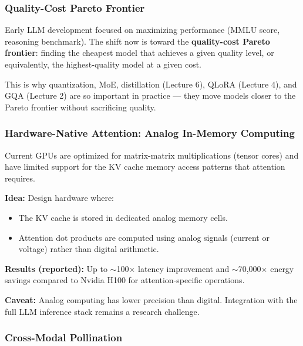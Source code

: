\documentclass[11pt, a4paper]{article}
\begin{document}
\subsubsection{Quality-Cost Pareto Frontier}

\begin{defbox}
Early LLM development focused on maximizing performance (MMLU score, reasoning benchmark). The shift now is toward the \textbf{quality-cost Pareto frontier}: finding the cheapest model that achieves a given quality level, or equivalently, the highest-quality model at a given cost.

This is why quantization, MoE, distillation (Lecture 6), QLoRA (Lecture 4), and GQA (Lecture 2) are so important in practice --- they move models closer to the Pareto frontier without sacrificing quality.
\end{defbox}

\subsubsection{Hardware-Native Attention: Analog In-Memory Computing}

\begin{defbox}
Current GPUs are optimized for matrix-matrix multiplications (tensor cores) and have limited support for the KV cache memory access patterns that attention requires.

\textbf{Idea:} Design hardware where:
\begin{itemize}[leftmargin=1.5em]
  \item The KV cache is stored in dedicated analog memory cells.
  \item Attention dot products are computed using analog signals (current or voltage) rather than digital arithmetic.
\end{itemize}

\textbf{Results (reported):} Up to $\sim$100$\times$ latency improvement and $\sim$70,000$\times$ energy savings compared to Nvidia H100 for attention-specific operations.

\textbf{Caveat:} Analog computing has lower precision than digital. Integration with the full LLM inference stack remains a research challenge.
\end{defbox}

\subsubsection{Cross-Modal Pollination}
\end{document}
